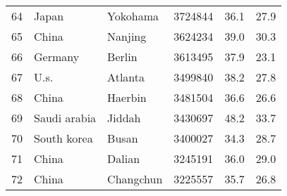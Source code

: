 \begin{center}
\begin{longtable}{clllcc}
        64                                       & Japan                                & Yokohama                          & 3724844                                 & 36.1                                  & 27.9                                  \\
        65                                       & China                                & Nanjing                           & 3624234                                 & 39.0                                  & 30.3                                  \\
        66                                       & Germany                              & Berlin                            & 3613495                                 & 37.9                                  & 23.1                                  \\
        67                                       & U.s.                                 & Atlanta                           & 3499840                                 & 38.2                                  & 27.8                                  \\
        68                                       & China                                & Haerbin                           & 3481504                                 & 36.6                                  & 26.6                                  \\
        69                                       & Saudi arabia                         & Jiddah                            & 3430697                                 & 48.2                                  & 33.7                                  \\
        70                                       & South korea                          & Busan                             & 3400027                                 & 34.3                                  & 28.7                                  \\
        71                                       & China                                & Dalian                            & 3245191                                 & 36.0                                  & 29.0                                  \\
        72                                       & China                                & Changchun                         & 3225557                                 & 35.7                                  & 26.8                                  \\

\end{longtable}
\end{center}
